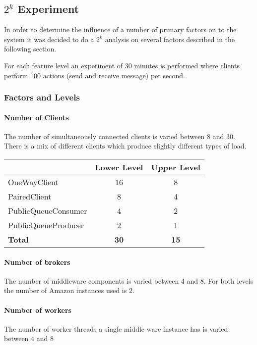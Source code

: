 \documentclass[milestone1.tex]{subfiles}
\begin{document}
\subsection{$2^k$ Experiment}
In order to determine the influence of a number of primary factors on to the system it was decided to do a $2^k$ analysis on several factors described in the following section.

For each feature level an experiment of 30 minutes is performed where clients perform 100 actions (send and receive message) per second.

\subsubsection{Factors and Levels}

\paragraph{Number of Clients}
The number of simultaneously connected clients is varied between 8 and 30. There is a mix of different clients which produce slightly different types of load.

\begin{tabular}{|l|c|c|}
\hline 
 & Lower Level & Upper Level \\ 
\hline 
OneWayClient & 16 & 8  \\ 
\hline 
PairedClient & 8 & 4 \\ 
\hline 
PublicQueueConsumer & 4 & 2 \\ 
\hline 
PublicQueueProducer & 2 & 1 \\ 
\hline 
\textbf{Total}  & \textbf{30} & \textbf{15} \\
\hline 
\end{tabular} 

\paragraph{Number of brokers}

The number of middleware components is varied between 4 and 8. For both levels the number of Amazon instances used is 2.

\paragraph{Number of workers}

The number of worker threads a single middle ware instance has is varied between 4 and 8
\end{document}
